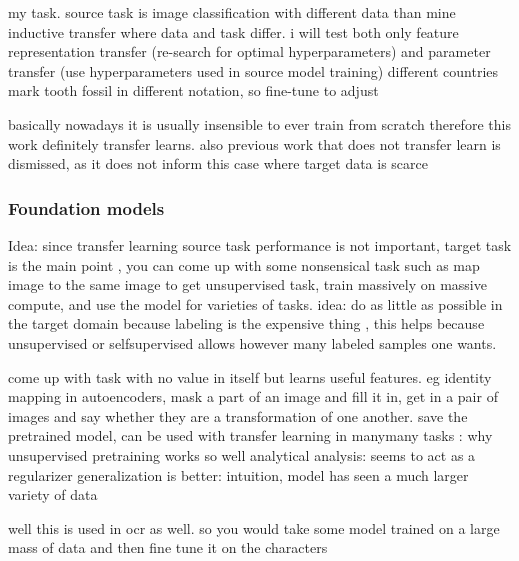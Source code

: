 \documentclass{article}
\begin{document}
my task. source task is image classification with different data than mine
inductive transfer where data and task differ.
i will test both only feature representation transfer (re-search for optimal hyperparameters)
and parameter transfer (use hyperparameters used in source model training)
different countries mark tooth fossil in different notation, so fine-tune to adjust

basically nowadays it is usually insensible to ever train from scratch \cite{cs231n_transfer_learning}
therefore this work definitely transfer learns. also previous work that does not transfer learn is dismissed, 
as it does not inform this case where target data is scarce

\subsubsection{Foundation models}


Idea: since transfer learning source task performance is not important, target task is the main point \cite{transferlearning_survey}, 
you can come up with some nonsensical task such as map image to the same image to get unsupervised task, train 
massively on massive compute, and use the model for varieties of tasks. idea: do as little as possible in the target domain
because labeling is the expensive thing \cite{engbook}, this helps because unsupervised or selfsupervised allows 
however many labeled samples one wants.

come up with task with no value in itself but learns useful features. eg identity mapping in autoencoders,
mask a part of an image and fill it in, get in a pair of images and say whether they are a transformation of one another.
save the pretrained model, can be used with transfer learning in manymany tasks
\cite{erhanWhyDoesUnsupervised2010}: why unsupervised pretraining works so well
analytical analysis: seems to act as a regularizer
generalization is better: intuition, model has seen a much larger variety of data 

well this is used in ocr as well.
so you would take some model trained on a large mass of data and then fine tune it on the characters
\end{document}
